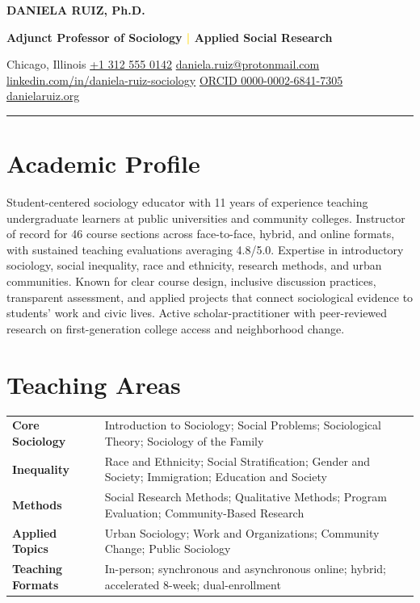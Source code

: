\documentclass[10pt,letterpaper]{article}
\newcommand{\contactsep}{\enspace\textcolor{Gold}{\textbullet}\enspace}
\begin{document}
\begin{center}
  {\fontsize{25}{28}\selectfont\bfseries\color{Navy} DANIELA RUIZ, Ph.D.}\par
  \vspace{2pt}
  {\large\bfseries\color{Teal} Adjunct Professor of Sociology \textcolor{Gold}{|} Applied Social Research}\par
  \vspace{5pt}
  Chicago, Illinois
  \contactsep \href{tel:+13125550142}{+1 312 555 0142}
  \contactsep \href{mailto:daniela.ruiz@protonmail.com}{daniela.ruiz@protonmail.com}\\[-1pt]
  \href{https://www.linkedin.com/in/daniela-ruiz-sociology}{linkedin.com/in/daniela-ruiz-sociology}
  \contactsep \href{https://orcid.org/0000-0002-6841-7305}{ORCID 0000-0002-6841-7305}
  \contactsep \href{https://www.danielaruiz.org}{danielaruiz.org}
\end{center}

\vspace{2pt}
\color{Gold}\rule{\textwidth}{1.2pt}
\color{Ink}

\section*{Academic Profile}

Student-centered sociology educator with 11 years of experience teaching undergraduate learners at public universities and community colleges. Instructor of record for 46 course sections across face-to-face, hybrid, and online formats, with sustained teaching evaluations averaging 4.8/5.0. Expertise in introductory sociology, social inequality, race and ethnicity, research methods, and urban communities. Known for clear course design, inclusive discussion practices, transparent assessment, and applied projects that connect sociological evidence to students' work and civic lives. Active scholar-practitioner with peer-reviewed research on first-generation college access and neighborhood change.

\section*{Teaching Areas}

\begin{tabularx}{\textwidth}{@{}>{\bfseries\color{Navy}}p{1.34in}Y@{}}
Core Sociology & Introduction to Sociology; Social Problems; Sociological Theory; Sociology of the Family \\
Inequality & Race and Ethnicity; Social Stratification; Gender and Society; Immigration; Education and Society \\
Methods & Social Research Methods; Qualitative Methods; Program Evaluation; Community-Based Research \\
Applied Topics & Urban Sociology; Work and Organizations; Community Change; Public Sociology \\
Teaching Formats & In-person; synchronous and asynchronous online; hybrid; accelerated 8-week; dual-enrollment
\end{tabularx}
\end{document}
